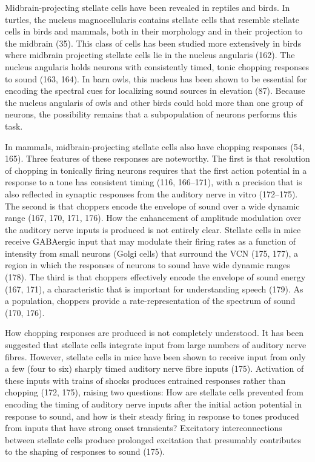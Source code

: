 \documentclass[10pt,a4paper]{article}
\begin{document}
Midbrain-projecting stellate cells have been revealed in reptiles and birds. In
turtles, the nucleus magnocellularis contains stellate cells that resemble
stellate
cells in birds and mammals, both in their morphology and in their projection
to the midbrain (35). This class of cells has been studied more extensively in
birds where midbrain projecting stellate cells lie in the nucleus angularis
(162).
The nucleus angularis holds neurons with consistently timed, tonic chopping
responses to sound (163, 164). In barn owls, this nucleus has been shown to be
essential for encoding the spectral cues for localizing sound sources in
elevation
(87). Because the nucleus angularis of owls and other birds could hold more than
one group of neurons, the possibility remains that a subpopulation of neurons
performs this task.

In mammals, midbrain-projecting stellate cells also have chopping responses
(54, 165). Three features of these responses are noteworthy. The first is that
resolution of chopping in tonically firing neurons requires that the first
action
potential in a response to a tone has consistent timing (116, 166--171), with a
precision that is also reflected in synaptic responses from the auditory nerve
in
vitro (172--175). The second is that choppers encode the envelope of sound over
a wide dynamic range (167, 170, 171, 176). How the enhancement of amplitude
modulation over the auditory nerve inputs is produced is not entirely clear.
Stellate cells in mice receive GABAergic input that may modulate their firing
rates as a function of intensity from small neurons (Golgi cells) that surround
the VCN (175, 177), a region in which the responses of neurons to sound have
wide dynamic ranges (178). The third is that choppers effectively encode the
envelope of sound energy (167, 171), a characteristic that is important for
understanding
speech (179). As a population, choppers provide a rate-representation
of the spectrum of sound (170, 176).

How chopping responses are produced is not completely understood. It has
been suggested that stellate cells integrate input from large numbers of
auditory
nerve fibres. However, stellate cells in mice have been shown to receive input
from only a few (four to six) sharply timed auditory nerve fibre inputs (175).
Activation of these inputs with trains of shocks produces entrained responses
rather than chopping (172, 175), raising two questions: How are stellate cells
prevented from encoding the timing of auditory nerve inputs after the initial
action potential in response to sound, and how is their steady firing in
response
to tones produced from inputs that have strong onset transients?  Excitatory
interconnections between stellate cells produce prolonged excitation that
presumably
contributes to the shaping of responses to sound (175).
\end{document}
